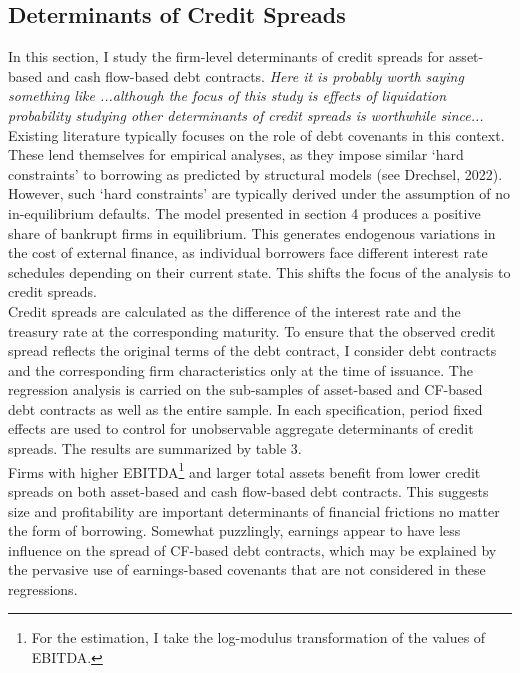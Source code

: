 \documentclass[12pt]{article}
\begin{document}
\subsection{Determinants of Credit Spreads \label{sec:credit spreads}} 
In this section, I study the firm-level determinants of credit spreads for asset-based and cash flow-based debt contracts. \textit{Here it is probably worth saying something like ...although the focus of this study is effects of liquidation probability studying other determinants of credit spreads is worthwhile since...} Existing literature typically focuses on the role of debt covenants in this context. These lend themselves for empirical analyses, as they impose similar `hard constraints' to borrowing as predicted by structural models (see Drechsel, 2022). However, such `hard constraints' are typically derived under the assumption of no in-equilibrium defaults. The model presented in section 4 produces a positive share of bankrupt firms in equilibrium. This generates endogenous variations in the cost of external finance, as individual borrowers face different interest rate schedules depending on their current state. This shifts the focus of the analysis to credit spreads. \vspace{3mm} \\
Credit spreads are calculated as the difference of the interest rate and the treasury rate at the corresponding maturity. To ensure that the observed credit spread reflects the original terms of the debt contract, I consider debt contracts and the corresponding firm characteristics only at the time of issuance. The regression analysis is carried on the sub-samples of asset-based and CF-based debt contracts as well as the entire sample. In each specification, period fixed effects are used to control for unobservable aggregate determinants of credit spreads. The results are summarized by table 3. \vspace{3mm} \\
Firms with higher EBITDA\footnote{For the estimation, I take the log-modulus transformation of the values of EBITDA.} and larger total assets benefit from lower credit spreads on both asset-based and cash flow-based debt contracts. This suggests size and profitability are important determinants of financial frictions no matter the form of borrowing. Somewhat puzzlingly, earnings appear to have less influence on the spread of CF-based debt contracts, which may be explained by the pervasive use of earnings-based covenants that are not considered in these regressions.  \vspace{3mm} \\
\end{document}

